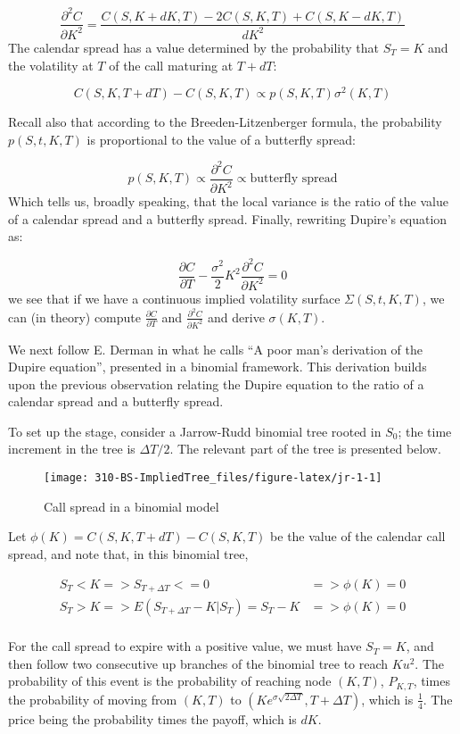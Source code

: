 \documentclass[]{tufte-book}
\begin{document}
\[
\frac{\partial^2C}{\partial K^2} = \frac{C(S,K+dK,T)-2C(S,K,T)+C(S,K-dK,T)}{dK^2}
\]
The calendar spread has a value determined by the probability that \(S_T = K\) and the volatility at \(T\) of the call maturing at \(T+dT\):

\[
C(S,K,T+dT)-C(S,K,T) \propto p(S,K,T) \sigma^2(K,T)
\]

Recall also that according to the Breeden-Litzenberger formula, the probability \(p(S,t,K,T)\) is proportional to the value of a butterfly spread:

\[
p(S,K,T) \propto \frac{\partial^2 C}{\partial K^2} \propto \textrm{butterfly spread}
\]
Which tells us, broadly speaking, that the local variance is the ratio of the value of a calendar spread and a butterfly spread. Finally, rewriting Dupire's equation as:

\[
\frac{\partial C}{\partial T} - \frac{\sigma^2}{2} K^2 \frac{\partial^2 C}{\partial K^2}  = 0
\label{eq:dupire-1}
\]
we see that if we have a continuous implied volatility surface \(\Sigma(S,t,K,T)\), we can (in theory) compute \(\frac{\partial C}{\partial T}\) and \(\frac{\partial^2 C}{\partial K^2}\) and derive \(\sigma(K,T)\).

We next follow E. Derman in what he calls ``A poor man's derivation of the Dupire equation'', presented in
a binomial framework. This derivation builds upon the previous observation relating the Dupire equation to the ratio of a calendar spread and a butterfly spread.

To set up the stage, consider a Jarrow-Rudd binomial tree rooted in \(S_0\);
the time increment in the tree is \(\Delta T / 2\). The relevant part of the tree is presented below.

\begin{figure}
\texttt{[image: 310-BS-ImpliedTree\_files/figure-latex/jr-1-1]} \caption[Call spread in a binomial model]{Call spread in a binomial model}\label{fig:jr-1}
\end{figure}

Let \(\phi(K)=C(S,K,T+dT)-C(S,K,T)\) be the value of the calendar call spread, and note that, in this binomial tree,

\begin{align}
S_T < K => S_{T+\Delta T} <= 0 &=> \phi(K) = 0 \\
S_T > K => E(S_{T+ \Delta T} - K| S_T) = S_T-K &=> \phi(K) = 0 \\
\end{align}

For the call spread to expire with a positive value, we must have \(S_T = K\), and then follow two consecutive up branches of the binomial tree to reach \(K u^2\).
The probability of this event is the probability of reaching node \((K,T)\), \(P_{K, T}\), times the probability of moving from \((K,T)\) to \((Ke^{\sigma \sqrt{2 \Delta T}}, T + \Delta T)\), which is \(\frac{1}{4}\). The price being the probability times the payoff, which is \(dK\).
\end{document}
